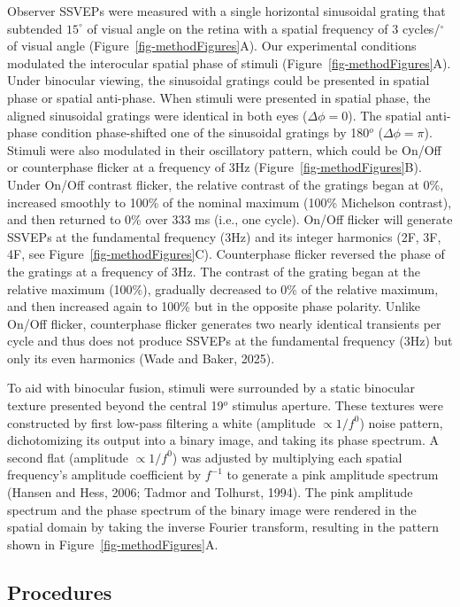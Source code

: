 \documentclass[review,
  12pt,
]{elsarticle}
\begin{document}
Observer SSVEPs were measured with a single horizontal sinusoidal
grating that subtended \(15^\circ\) of visual angle on the retina with a
spatial frequency of 3 cycles/\(^\circ\) of visual angle
(Figure~\ref{fig-methodFigures}A). Our experimental conditions modulated
the interocular spatial phase of stimuli
(Figure~\ref{fig-methodFigures}A). Under binocular viewing, the
sinusoidal gratings could be presented in spatial phase or spatial
anti-phase. When stimuli were presented in spatial phase, the aligned
sinusoidal gratings were identical in both eyes (\(\Delta \phi = 0\)).
The spatial anti-phase condition phase-shifted one of the sinusoidal
gratings by 180\(^o\) (\(\Delta \phi = \pi\)). Stimuli were also
modulated in their oscillatory pattern, which could be On/Off or
counterphase flicker at a frequency of 3Hz
(Figure~\ref{fig-methodFigures}B). Under On/Off contrast flicker, the
relative contrast of the gratings began at 0\%, increased smoothly to
100\% of the nominal maximum (100\% Michelson contrast), and then
returned to 0\% over 333 ms (i.e., one cycle). On/Off flicker will
generate SSVEPs at the fundamental frequency (3Hz) and its integer
harmonics (2F, 3F, 4F, see Figure~\ref{fig-methodFigures}C).
Counterphase flicker reversed the phase of the gratings at a frequency
of 3Hz. The contrast of the grating began at the relative maximum
(100\%), gradually decreased to 0\% of the relative maximum, and then
increased again to 100\% but in the opposite phase polarity. Unlike
On/Off flicker, counterphase flicker generates two nearly identical
transients per cycle and thus does not produce SSVEPs at the fundamental
frequency (3Hz) but only its even harmonics (Wade and Baker, 2025).

To aid with binocular fusion, stimuli were surrounded by a static
binocular texture presented beyond the central 19\(^o\) stimulus
aperture. These textures were constructed by first low-pass filtering a
white (amplitude \(\propto 1/f^0\)) noise pattern, dichotomizing its
output into a binary image, and taking its phase spectrum. A second flat
(amplitude \(\propto 1/f^0\)) was adjusted by multiplying each spatial
frequency's amplitude coefficient by \(f^{-1}\) to generate a pink
amplitude spectrum (Hansen and Hess, 2006; Tadmor and Tolhurst, 1994).
The pink amplitude spectrum and the phase spectrum of the binary image
were rendered in the spatial domain by taking the inverse Fourier
transform, resulting in the pattern shown in
Figure~\ref{fig-methodFigures}A.

\subsection{Procedures}\label{procedures}
\end{document}
